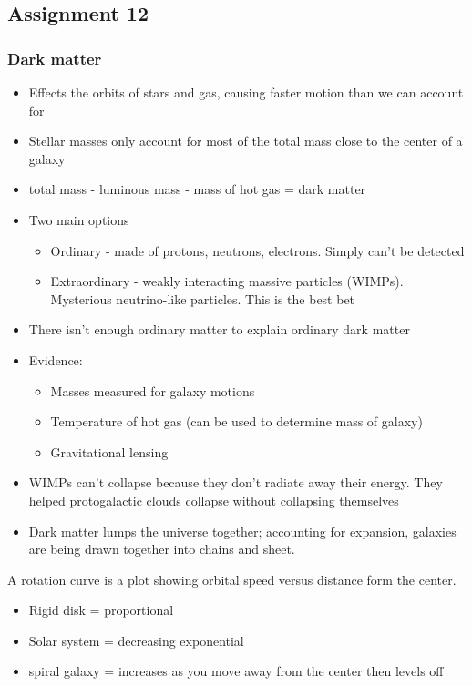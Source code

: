 \subsection{Assignment 12}

\subsubsection{Dark matter}

\begin{itemize}
    \item Effects the orbits of stars and gas, causing faster motion than we can account for
    \item Stellar masses only account for most of the total mass close to the center of a galaxy
    \item total mass - luminous mass - mass of hot gas = dark matter
    \item Two main options
    \begin{itemize}
        \item Ordinary - made of protons, neutrons, electrons.  Simply can't be detected
        \item Extraordinary - weakly interacting massive particles (WIMPs).  Mysterious neutrino-like particles.  This is the best bet
    \end{itemize}
    \item There isn't enough ordinary matter to explain ordinary dark matter
    \item Evidence:
    \begin{itemize}
        \item Masses measured for galaxy motions
        \item Temperature of hot gas (can be used to determine mass of galaxy)
        \item Gravitational lensing
    \end{itemize}
    \item WIMPs can't collapse because they don't radiate away their energy.  They helped protogalactic clouds collapse without collapsing themselves
    \item Dark matter lumps the universe together; accounting for expansion, galaxies are being drawn together into chains and sheet.
\end{itemize}

A rotation curve is a plot showing orbital speed versus distance form the center.
\begin{itemize}
    \item Rigid disk = proportional
    \item Solar system = decreasing exponential
    \item spiral galaxy = increases as you move away from the center then levels off
\end{itemize}

